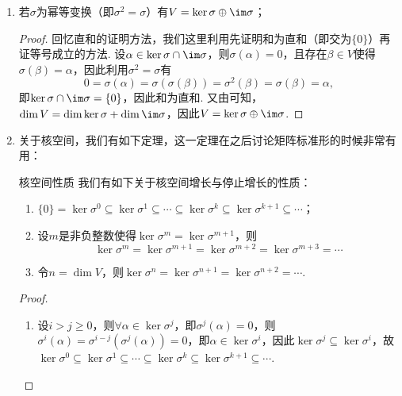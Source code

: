 \begin{enumerate}
    \item \label{item:6:像与核的进一步讨论:1}
          若$\sigma$为幂等变换（即$\sigma^2=\sigma$）有$V=\ker\sigma\oplus\im \sigma$；

          \begin{proof}
              回忆直和的证明方法，我们这里利用先证明和为直和（即交为$\{0\}$）再证等号成立的方法. 设$\alpha\in\ker\sigma\cap\im \sigma$，则$\sigma(\alpha)=0$，且存在$\beta\in V$使得$\sigma(\beta)=\alpha$，因此利用$\sigma^2=\sigma$有
              \[0=\sigma(\alpha)=\sigma(\sigma(\beta))=\sigma^2(\beta)=\sigma(\beta)=\alpha,\]
              即$\ker\sigma\cap\im \sigma=\{0\}$，因此和为直和. 又由可知，$\dim V=\dim\ker\sigma+\dim\im \sigma$，因此$V=\ker\sigma\oplus\im \sigma$.
          \end{proof}

    \item 关于核空间，我们有如下定理，这一定理在之后讨论矩阵标准形的时候非常有用：
          \begin{theorem}{}{核空间性质}
              我们有如下关于核空间增长与停止增长的性质：
              \begin{enumerate}
                  \item $\{0\}=\ker \sigma^0\subseteq\ker \sigma^1\subseteq\cdots\subseteq \ker \sigma^k\subseteq\ker \sigma^{k+1}\subseteq\cdots$；

                  \item 设$m$是非负整数使得$\ker \sigma^m=\ker \sigma^{m+1}$，则
                        \[\ker \sigma^m=\ker \sigma^{m+1}=\ker \sigma^{m+2}=\ker \sigma^{m+3}=\cdots\]

                  \item 令$n=\dim V$，则$\ker \sigma^n=\ker \sigma^{n+1}=\ker \sigma^{n+2}=\cdots$.
              \end{enumerate}
          \end{theorem}

          \begin{proof}
              \begin{enumerate}
                  \item 设$i>j\geqslant 0$，则$\forall\alpha\in\ker\sigma^j$，即$\sigma^j(\alpha)=0$，则$\sigma^i(\alpha)=\sigma^{i-j}(\sigma^j(\alpha))=0$，即$\alpha\in\ker\sigma^i$，因此$\ker\sigma^j\subseteq\ker\sigma^i$，故$\ker \sigma^0\subseteq\ker \sigma^1\subseteq\cdots\subseteq \ker \sigma^k\subseteq\ker \sigma^{k+1}\subseteq\cdots$.


\end{enumerate}
\end{proof}
\end{enumerate}
